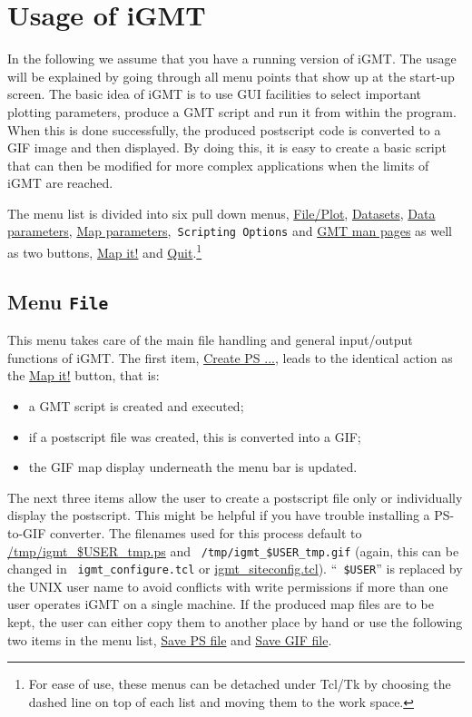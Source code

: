 \documentclass[11pt]{article}
\begin{document}
\section{Usage of iGMT}

In the following we assume that you have a running version of iGMT.
The usage will be explained by going through all menu points that show
up at the start-up screen. The basic idea of iGMT is to use GUI
facilities to select important plotting parameters, produce a GMT
script and run it from within the program. When this is done
successfully, the produced postscript code is converted to a GIF image
and then displayed. By doing this, it is easy to create a basic script
that can then be modified for more complex applications when the
limits of iGMT are reached.

The menu list is divided into six pull down menus, \url{File/Plot},
\url{Datasets}, \url{Data parameters}, \url{Map parameters},{\tt
  Scripting Options} and \url{GMT man pages} as well as two buttons,
\url{Map it!} and \url{Quit}.\footnote{For ease of use, these menus
  can be detached under Tcl/Tk by choosing the dashed line on top of
  each list and moving them to the work space.}


\subsection{Menu {\tt File}}
This menu takes care of the main file handling and general
input/output functions of iGMT. The
first item, \url{Create PS ...}, leads to the identical action as
the \url{Map it!} button, that is:
\begin{itemize}
\item a GMT script is created and executed;
\item if a postscript file was created, this is converted into a GIF;
\item the GIF map display underneath the menu bar is updated.
\end{itemize}
The next three items allow the user to create a postscript file only
or individually display the postscript. This might be helpful if you
have trouble installing a PS-to-GIF converter.  The filenames used for
this process default to \url{/tmp/igmt_$USER_tmp.ps} and {\tt
  /tmp/igmt\_\$USER\_tmp.gif} (again, this can be changed in {\tt
  igmt\_configure.tcl} or \url{igmt_siteconfig.tcl}). ``{\tt
  \$USER}'' is replaced by the UNIX user name to avoid conflicts with
write permissions if more than one user operates iGMT on a single
machine. If the produced map files are to be kept, the user can either
copy them to another place by hand or use the following two items in
the menu list, \url{Save PS file} and \url{Save GIF file}.
\end{document}
